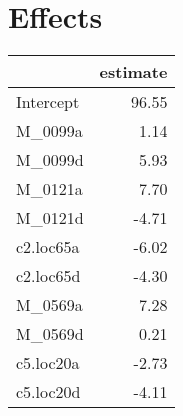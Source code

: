 \documentclass[a4paper,11pt]{article}\usepackage[]{graphicx}\usepackage[]{color}
\begin{document}
\clearpage
\section{Effects}
\begin{table}[ht]
\begin{flushleft}
\begin{tabular}{lr}
  \hline
 & estimate \\ 
  \hline
Intercept & 96.55 \\ 
  M\_0099a & 1.14 \\ 
  M\_0099d & 5.93 \\ 
  M\_0121a & 7.70 \\ 
  M\_0121d & -4.71 \\ 
  c2.loc65a & -6.02 \\ 
  c2.loc65d & -4.30 \\ 
  M\_0569a & 7.28 \\ 
  M\_0569d & 0.21 \\ 
  c5.loc20a & -2.73 \\ 
  c5.loc20d & -4.11 \\ 
   \hline
\end{tabular}
\label{effects}
\end{flushleft}
\end{table}

\end{document}
